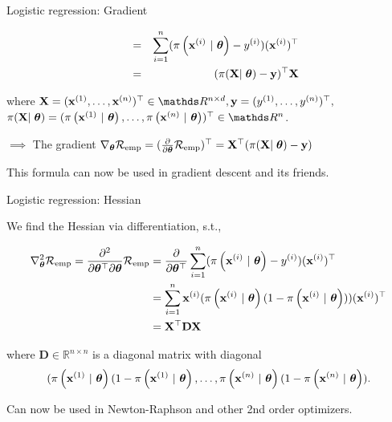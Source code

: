 \documentclass[11pt,compress,t,notes=noshow, xcolor=table]{beamer}
\begin{document}
\begin{frame}{Logistic regression: Gradient}

\begin{align*}
  \quad &=& 
  \sumin (\pixit - \yi)(\xi)^\top\\
    \quad &=& 
  (\pi(\mathbf{X}\vert\;\thetav) - \mathbf{y})^\top\mathbf{X}\\
\end{align*}

where  $\mathbf{X} = (
    \xi[1], \dots, 
    \xi[n])^\top \in \R^{n\times d}, \mathbf{y} = (
    \yi[1], \dots,
    \yi[n]
)^\top,$ \\ $\pi(\mathbf{X}\vert\;\thetav) = (
    \pixit[1], \dots,
    \pixit[n]
)^\top \in \R^{n}$.

\vfill

$\implies$ The gradient $\nabla_{\thetav}\riske = (\frac{\partial}{\partial\thetav}\riske)^\top =  \mathbf{X}^\top(\pi(\mathbf{X}\vert\;\thetav) - \mathbf{y})$ 

\vfill

This formula can now be used in gradient descent and its friends.

\end{frame}


\begin{frame}{Logistic regression: Hessian}

We find the Hessian via differentiation, s.t.,

{\small
\begin{align*}
  \nabla^2_{\thetav}\riske  = \frac{\partial^2}{\partial{\thetav^\top}\partial\thetav}\riske  & =  
 \frac{\partial}{\partial{\thetav^\top}} \sumin (\pixit - \yi)(\xi)^\top\\
 & =  
  \sum^n_{i=1}\xi (\pixit(1-\pixit))(\xi)^\top\\
  & =  
\mathbf{X}^\top \mathbf{D} \mathbf{X}\\
\end{align*}

where $\mathbf{D} \in \mathbb{R}^{n\times n}$ is a diagonal matrix with diagonal 
$$(\pixit[1](1-\pixit[1], \dots, \pixit[n](1-\pixit[n]).$$
}

Can now be used in Newton-Raphson and other 2nd order optimizers.


\end{frame}
\end{document}
